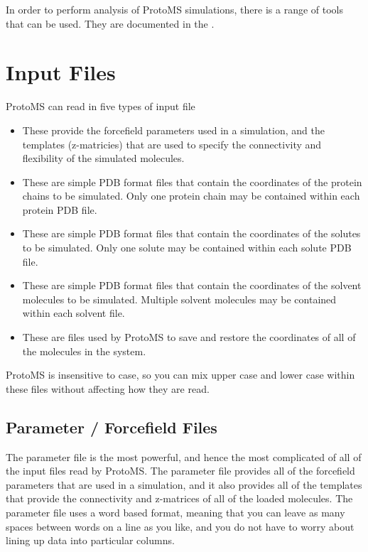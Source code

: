 \documentclass[letterpaper,10pt,english]{sphinxmanual}
\begin{document}
In order to perform analysis of ProtoMS simulations, there is a range of tools that can be used. They are documented in the .


\chapter{Input Files}
\label{\detokenize{protoms:input-files}}
ProtoMS can read in five types of input file
\begin{itemize}
\item {} 
 These provide the forcefield parameters used in a simulation, and the templates (z-matricies) that are used to specify the connectivity and flexibility of the simulated molecules.

\item {} 
 These are simple PDB format files that contain the coordinates of the protein chains to be simulated. Only one protein chain may be contained within each protein PDB file.

\item {} 
 These are simple PDB format files that contain the coordinates of the solutes to be simulated. Only one solute may be contained within each solute PDB file.

\item {} 
 These are simple PDB format files that contain the coordinates of the solvent molecules to be simulated. Multiple solvent molecules may be contained within each solvent file.

\item {} 
 These are files used by ProtoMS to save and restore the coordinates of all of the molecules in the system.

\end{itemize}

ProtoMS is insensitive to case, so you can mix upper case and lower case within these files without affecting how
they are read.


\section{Parameter / Forcefield Files}
\label{\detokenize{protoms:parameter-forcefield-files}}\label{\detokenize{protoms:parfil}}
The parameter file is the most powerful, and hence the most complicated of all of the input files read by ProtoMS. The parameter file provides all of the forcefield parameters that are used in a simulation, and it also provides all of the templates that provide the connectivity and z-matrices of all of the loaded molecules. The parameter file uses a word based format, meaning that you can leave as many spaces between words on a line as you like, and you do not have to worry about lining up data into particular columns.
\end{document}
